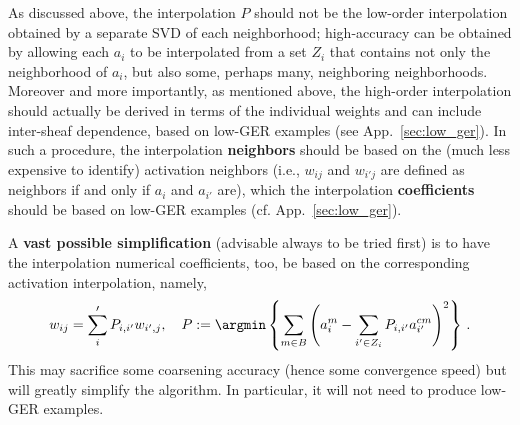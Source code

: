 \documentclass{article} %
\begin{document}
As discussed above, the interpolation $P$ should not be the low-order interpolation obtained by a separate SVD of each neighborhood; high-accuracy can be obtained by allowing each $a_i$ to be interpolated from a set $Z_i$ that contains not only the neighborhood of $a_i$, but also some, perhaps many, neighboring neighborhoods. Moreover and more importantly, as mentioned above, the high-order interpolation should actually be derived in terms of the individual weights and can include inter-sheaf dependence, based on low-GER examples (see App.~\ref{sec:low_ger}). In such a procedure, the interpolation \textbf{neighbors} should be based on the (much less expensive to identify) activation neighbors (i.e., $w_{ij}$ and $w_{i'j}$ are defined as neighbors if and only if $a_i$ and $a_{i'}$ are), which the interpolation \textbf{coefficients} should be based on low-GER examples (cf. App.~\ref{sec:low_ger}).



A \textbf{vast possible simplification} (advisable always to be tried first) is to have the interpolation numerical coefficients, too, be based on the corresponding activation interpolation, namely,
\begin{equation}
    w_{ij} = \sum_i' P_{i,i'} w_{i',j}, \quad
    P := \argmin \left\{ 
        \sum_{m \in B} \left( a_i^m - \sum_{i' \in Z_i} P_{i,i'} a_{i'}^{cm} \right)^2 
        \right\}\,.
	\label{P_ls}
\end{equation}
This may sacrifice some coarsening accuracy (hence some convergence speed)  but will greatly simplify the algorithm. In particular, it will not need to produce low-GER examples.
\end{document}
